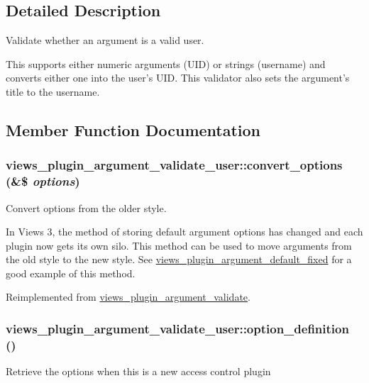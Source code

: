 \subsection{Detailed Description}
Validate whether an argument is a valid user.

This supports either numeric arguments (UID) or strings (username) and converts either one into the user's UID. This validator also sets the argument's title to the username. 

\subsection{Member Function Documentation}
\hypertarget{classviews__plugin__argument__validate__user_a0e9153f6d0cfcd5f28854731d89cce0e}{
\subsubsection[{convert\_\-options}]{\setlength{\rightskip}{0pt plus 5cm}views\_\-plugin\_\-argument\_\-validate\_\-user::convert\_\-options (\&\$ {\em options})}}
\label{classviews__plugin__argument__validate__user_a0e9153f6d0cfcd5f28854731d89cce0e}
Convert options from the older style.

In Views 3, the method of storing default argument options has changed and each plugin now gets its own silo. This method can be used to move arguments from the old style to the new style. See \hyperlink{classviews__plugin__argument__default__fixed}{views\_\-plugin\_\-argument\_\-default\_\-fixed} for a good example of this method. 

Reimplemented from \hyperlink{classviews__plugin__argument__validate_a2de4a9571ea48105e195c483b13f5577}{views\_\-plugin\_\-argument\_\-validate}.\hypertarget{classviews__plugin__argument__validate__user_a58ce7613662512981f4a6996c300fa07}{
\subsubsection[{option\_\-definition}]{\setlength{\rightskip}{0pt plus 5cm}views\_\-plugin\_\-argument\_\-validate\_\-user::option\_\-definition ()}}
\label{classviews__plugin__argument__validate__user_a58ce7613662512981f4a6996c300fa07}
Retrieve the options when this is a new access control plugin 

